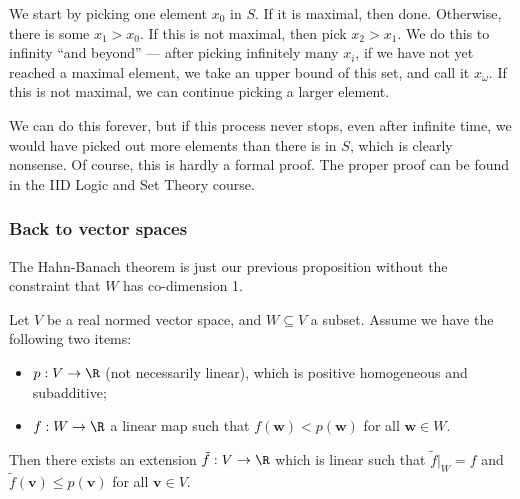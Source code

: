 \documentclass[a4paper]{article}
\begin{document}
We start by picking one element $x_0$ in $S$. If it is maximal, then done. Otherwise, there is some $x_1 > x_0$. If this is not maximal, then pick $x_2 > x_1$. We do this to infinity ``and beyond'' --- after picking infinitely many $x_i$, if we have not yet reached a maximal element, we take an upper bound of this set, and call it $x_\omega$. If this is not maximal, we can continue picking a larger element.

We can do this forever, but if this process never stops, even after infinite time, we would have picked out more elements than there is in $S$, which is clearly nonsense. Of course, this is hardly a formal proof. The proper proof can be found in the IID Logic and Set Theory course.

\subsubsection*{Back to vector spaces}
The Hahn-Banach theorem is just our previous proposition without the constraint that $W$ has co-dimension 1.
\begin{thm}
  Let $V$ be a real normed vector space, and $W\subseteq V$ a subset. Assume we have the following two items:
  \begin{itemize}
    \item $p: V \to \R$ (not necessarily linear), which is positive homogeneous and subadditive;
    \item $f: W \to \R$ a linear map such that $f(\mathbf{w}) < p (\mathbf{w})$ for all $\mathbf{w}\in W$.
  \end{itemize}
  Then there exists an extension $\tilde{f}: V\to \R$ which is linear such that $\tilde{f}|_{W} = f$ and $\tilde{f}(\mathbf{v}) \leq p(\mathbf{v})$ for all $\mathbf{v}\in V$.
\end{thm}
\end{document}

